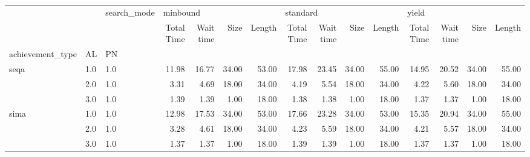 \begin{tabular}{lllrrrrrrrrrrrr}
\toprule
     &     & search\_mode & \multicolumn{4}{l}{minbound} & \multicolumn{4}{l}{standard} & \multicolumn{4}{l}{yield} \\
     &     & {} & Total Time & Wait time &  Size & Length & Total Time & Wait time &  Size & Length & Total Time & Wait time &  Size & Length \\
achievement\_type & AL & PN &            &           &       &        &            &           &       &        &            &           &       &        \\
\midrule
seqa & 1.0 & 1.0 &      11.98 &     16.77 & 34.00 &  53.00 &      17.98 &     23.45 & 34.00 &  55.00 &      14.95 &     20.52 & 34.00 &  55.00 \\
     & 2.0 & 1.0 &       3.31 &      4.69 & 18.00 &  34.00 &       4.19 &      5.54 & 18.00 &  34.00 &       4.22 &      5.60 & 18.00 &  34.00 \\
     & 3.0 & 1.0 &       1.39 &      1.39 &  1.00 &  18.00 &       1.38 &      1.38 &  1.00 &  18.00 &       1.37 &      1.37 &  1.00 &  18.00 \\
sima & 1.0 & 1.0 &      12.98 &     17.53 & 34.00 &  53.00 &      17.66 &     23.28 & 34.00 &  53.00 &      15.35 &     20.94 & 34.00 &  55.00 \\
     & 2.0 & 1.0 &       3.28 &      4.61 & 18.00 &  34.00 &       4.23 &      5.59 & 18.00 &  34.00 &       4.21 &      5.57 & 18.00 &  34.00 \\
     & 3.0 & 1.0 &       1.37 &      1.37 &  1.00 &  18.00 &       1.39 &      1.39 &  1.00 &  18.00 &       1.37 &      1.37 &  1.00 &  18.00 \\
\bottomrule
\end{tabular}
